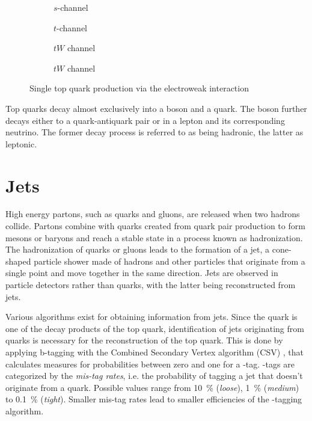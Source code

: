 \begin{figure}[h]
    \centering
    \begin{subfigure}[b]{0.2\textwidth}
        \centering
        
        \caption{$s$-channel}
        \label{fig:top_single_s}
    \end{subfigure}\hfill
    \begin{subfigure}[b]{0.2\textwidth}
        \centering
        
        \caption{$t$-channel}
        \label{fig:top_single_t}
    \end{subfigure}\hfill
    \begin{subfigure}[b]{0.2\textwidth}
        \centering
        
        \caption{$tW$ channel}
        \label{fig:top_single_tw_1}
    \end{subfigure}\hfill
    \begin{subfigure}[b]{0.2\textwidth}
        \centering
        \vfill
        
        \caption{$tW$ channel}
        \label{fig:top_single_tw_2}
    \end{subfigure}
    \caption{Single top quark production via the electroweak interaction}
    \label{fig:top_single}
\end{figure}

Top quarks decay almost exclusively into a \PW boson and a \Pbottom quark. The boson further decays either to a quark-antiquark pair or in a lepton and its corresponding neutrino. The former decay process is referred to as being hadronic, the latter as leptonic.

\section{Jets}
High energy partons, such as quarks and gluons, are released when two hadrons collide. Partons combine with quarks created from quark pair production to form mesons or baryons and reach a stable state in a process known as hadronization. The hadronization of quarks or gluons leads to the formation of a jet, a cone-shaped particle shower made of hadrons and other particles that originate from a single point and move together in the same direction. Jets are observed in particle detectors rather than quarks, with the latter being reconstructed from jets.

Various algorithms exist for obtaining information from jets. Since the \Pbottom quark is one of the decay products of the top quark, identification of jets originating from \Pbottom quarks is necessary for the reconstruction of the top quark. This is done by applying b-tagging with the Combined Secondary Vertex algorithm (CSV) \cite{Chatrchyan:1494669}, that calculates measures for probabilities between zero and one for a \Pbottom-tag. \Pbottom-tags are categorized by the \emph{mis-tag rates}, i.e. the probability of tagging a jet that doesn't originate from a \Pbottom quark. Possible values range from \SI{10}{\%} (\emph{loose}), \SI{1}{\%} (\emph{medium}) to \SI{0.1}{\%} (\emph{tight}). Smaller mis-tag rates lead to smaller efficiencies of the \Pbottom-tagging algorithm.
